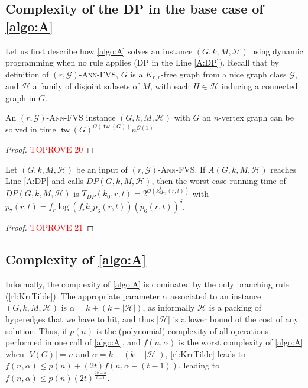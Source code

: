 \documentclass{amsart}
\newcommand{\G}{\mathcal{G}}
\newcommand{\mH}{\mathcal{H}}
\newcommand{\tdp}{T_{DP}}
\DeclareMathOperator\tw{\textsf{tw}}
\newcommand{\AFVS}{\textsc{$(r,\G)$-Ann-FVS}\xspace}
\newcommand{\ruleref}[1]{\hyperref[#1]{\ref*{#1}}}
\renewcommand{\O}{\mathcal{O}}
\begin{document}
\subsection{Complexity of the DP in the base case of \autoref{algo:A}}
Let us first describe how \autoref{algo:A} solves an instance  $(G, k, M, \mH)$ using dynamic programming when no rule applies (DP in the Line \ref{A:DP}). Recall that by definition of \AFVS, $G$ is a $K_{r,r}$-free graph from a nice graph class $\G$, and $\mH$ a family of disjoint subsets of $M$, with each $H\in \mH$ inducing a connected graph in $G$. 



\begin{theorem}\label{th:solveAFVS}
    An \AFVS instance $(G, k, M, \mH)$ with $G$ an $n$-vertex graph can be solved in time $\tw(G)^{\O(\tw (G))}n^{\O(1)}$.
\end{theorem}
\begin{proof}\textcolor{red}{TOPROVE 20}\end{proof}

\begin{corollary}\label{cor:DP}
Let $(G,k,M,\mH)$ be an input of \AFVS.
If $A(G,k,M,\mH)$ reaches Line \ref{A:DP} and calls
$DP(G,k,M,\mH)$, then the worst case running time of $DP(G,k,M,\mH)$ is  $\tdp(k_0,r,t)=2^{\O\left(k_0^{\delta}p_7(r,t)\right)}$ with $p_7(r,t)=f_r\log (f_rk_0p_6(r,t))(p_6(r,t))^{\delta}$.
\end{corollary}
\begin{proof}\textcolor{red}{TOPROVE 21}\end{proof}

\subsection{Complexity of \autoref{algo:A}}
Informally, the complexity of \autoref{algo:A} is dominated by the only branching rule (\ruleref{rl:KrrTilde}). The appropriate parameter $\alpha$ associated to an instance $(G,k,M,\mH)$ is $\alpha=k+(k-|\mH|)$, as informally $\mH$ is a packing of hyperedges that we have to hit, and thus $|\mH|$ is a lower bound of the cost of any solution. Thus, if $p(n)$ is the (polynomial) complexity of all operations performed in one call of \autoref{algo:A}, and $f(n,\alpha)$ is the worst complexity of \autoref{algo:A} when $|V(G)|=n$ and $\alpha=k+(k-|\mH|)$, \ruleref{rl:KrrTilde} leads to $f(n,\alpha) \le p(n)+(2t)f(n,\alpha-(t-1))$, leading to $f(n,\alpha) \le p(n)(2t)^{\frac{2k-h}{t-1}}$.
\end{document}
